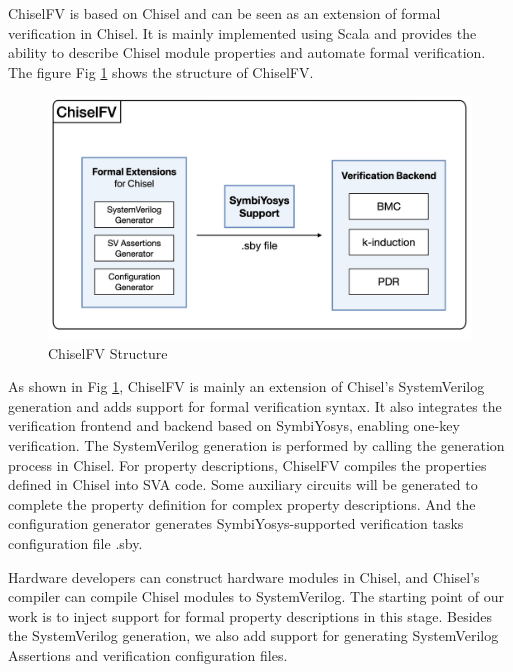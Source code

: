 \documentclass[conference]{IEEEtran}
\theoremstyle{definition}
\begin{document}
ChiselFV is based on Chisel and can be seen as an extension of formal verification in Chisel. 
It is mainly implemented using Scala and provides the ability to describe Chisel module properties and automate formal verification. 
The figure Fig \ref{fig: structure} shows the structure of ChiselFV.

\begin{figure}[!htbp]
    \begin{center}
    \includegraphics[width=1\linewidth]{pics/structure.png}
    \caption{ChiselFV Structure}
    \label{fig: structure}
    \end{center}
\end{figure}

As shown in Fig \ref{fig: structure}, ChiselFV is mainly an extension of Chisel's SystemVerilog generation and adds support for formal verification syntax. It also integrates the verification frontend and backend based on SymbiYosys, enabling one-key verification. The SystemVerilog generation is performed by calling the generation process in Chisel.
For property descriptions, ChiselFV compiles the properties defined in Chisel into SVA code. Some auxiliary circuits will be generated to complete the property definition for complex property descriptions.
And the configuration generator generates SymbiYosys-supported verification tasks configuration file .sby. 

Hardware developers can construct hardware modules in Chisel, and Chisel's compiler can compile Chisel modules to SystemVerilog. The starting point of our work is to inject support for formal property descriptions in this stage.
Besides the SystemVerilog generation, we also add support for generating SystemVerilog Assertions and verification configuration files.
\end{document}
